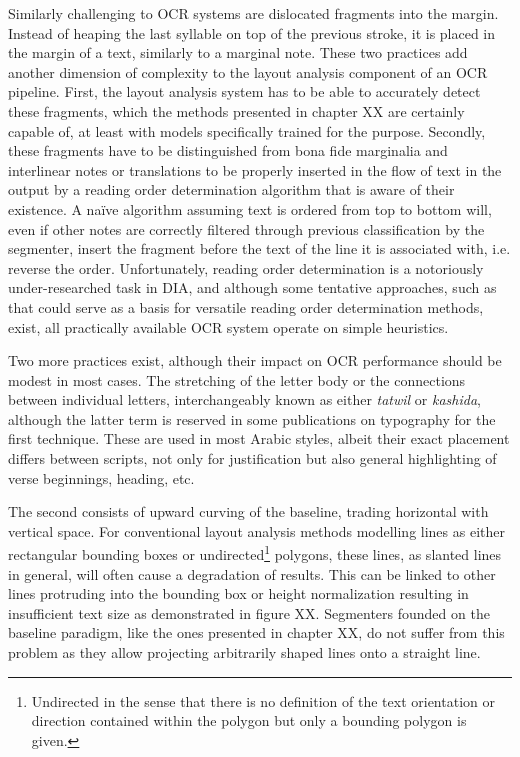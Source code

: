 Similarly challenging to OCR systems are dislocated fragments into the margin.
Instead of heaping the last syllable on top of the previous stroke, it is
placed in the margin of a text, similarly to a marginal note. These two
practices add another dimension of complexity to the layout analysis component
of an OCR pipeline. First, the layout analysis system has to be able to
accurately detect these fragments, which the methods presented in chapter XX
are certainly capable of, at least with models specifically trained for the
purpose. Secondly, these fragments have to be distinguished from bona fide
marginalia and interlinear notes or translations to be properly inserted in the
flow of text in the output by a reading order determination algorithm that is
aware of their existence. A naïve algorithm assuming text is ordered from top
to bottom will, even if other notes are correctly filtered through previous
classification by the segmenter, insert the fragment before the text of the
line it is associated with, i.e. reverse the order. Unfortunately, reading
order determination is a notoriously under-researched task in DIA, and although
some tentative approaches, such as \cite{dejean2019versatile} that could serve
as a basis for versatile reading order determination methods, exist, all
practically available OCR system operate on simple heuristics.

Two more practices exist, although their impact on OCR performance should be
modest in most cases. The stretching of the letter body or the connections
between individual letters, interchangeably known as either \emph{tatwil} or
\emph{kashida}, although the latter term is reserved in some publications on
typography for the first technique. These are used in most Arabic styles,
albeit their exact placement differs between scripts, not only for
justification but also general highlighting of verse beginnings, heading, etc. 

The second consists of upward curving of the baseline, trading horizontal with
vertical space. For conventional layout analysis methods modelling lines as
either rectangular bounding boxes or undirected\footnote{Undirected in the
sense that there is no definition of the text orientation or direction
contained within the polygon but only a bounding polygon is given.} polygons,
these lines, as slanted lines in general, will often cause a degradation of
results. This can be linked to other lines protruding into the bounding box or
height normalization resulting in insufficient text size as demonstrated in
figure XX. Segmenters founded on the baseline paradigm, like the ones presented
in chapter XX, do not suffer from this problem as they allow projecting
arbitrarily shaped lines onto a straight line.

